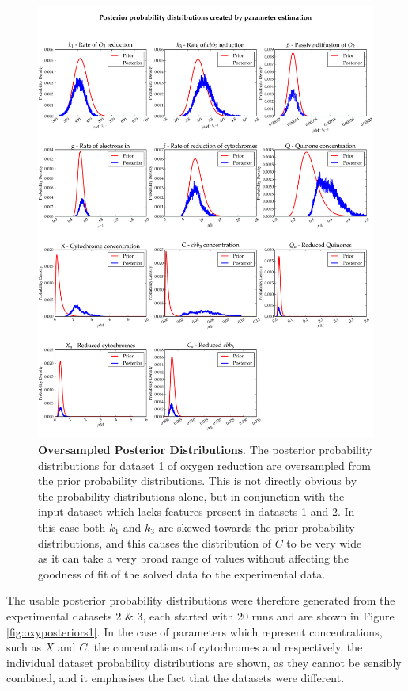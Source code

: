 \begin{figure}[p]
 \centering
 \includegraphics[width=15cm, trim=0cm 0cm 0cm 0cm]{./05-oxygenreduction/data/oversampling_posteriors.pdf}
 \caption[Oversampled Posterior Distributions]{{\bf Oversampled Posterior Distributions}. The posterior probability distributions for dataset 1 of oxygen reduction are oversampled from the prior probability distributions. This is not directly obvious by the probability distributions alone, but in conjunction with the input dataset which lacks features present in datasets 1 and 2. In this case both $k_1$ and $k_3$ are skewed towards the prior probability distributions, and this causes the distribution of $C$ to be very wide as it can take a very broad range of values without affecting the goodness of fit of the solved data to the experimental data.
 \label{fig:dataset1posterior}}
\end{figure}

The usable posterior probability distributions were therefore generated from the experimental datasets 2 \& 3, each started with 20 runs and are shown in Figure \ref{fig:oxyposteriors1}. In the case of parameters which represent concentrations, such as $X$ and $C$, the concentrations of cytochromes and \cbbthree{} respectively, the individual dataset probability distributions are shown, as they cannot be sensibly combined, and it emphasises the fact that the datasets were different.

